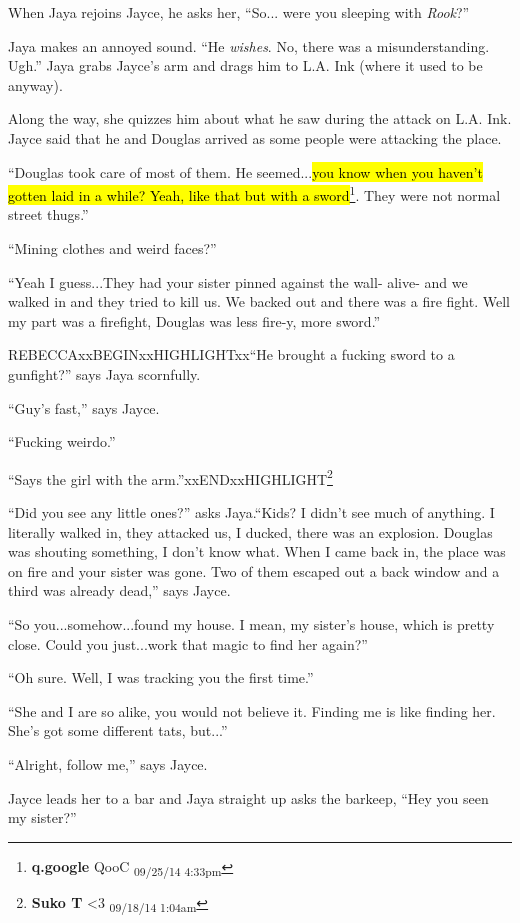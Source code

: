 When Jaya rejoins Jayce, he asks her, ``So... were you sleeping with \textit{Rook}?''

Jaya makes an annoyed sound.  ``He \textit{wishes}.  No, there was a misunderstanding.  Ugh.''  Jaya grabs Jayce's arm and drags him to L.A. Ink (where it used to be anyway).

Along the way, she quizzes him about what he saw during the attack on L.A. Ink.  Jayce said that he and Douglas arrived as some people were attacking the place.  

``Douglas took care of most of them. He seemed...\hl{you know when you haven't gotten laid in a while?  Yeah, like that but with a sword}\footnote{\textbf{q.google }QooC \textsubscript{09/25/14 4:33pm}}.  They were not normal street thugs.''

``Mining clothes and weird faces?''

``Yeah I guess...They had your sister pinned against the wall- alive- and we walked in and they tried to kill us.  We backed out and there was a fire fight.  Well my part was a firefight, Douglas was less fire-y, more sword.''

REBECCAxxBEGINxxHIGHLIGHTxx``He brought a fucking sword to a gunfight?'' says Jaya scornfully.

``Guy's fast,'' says Jayce.

``Fucking weirdo.''

``Says the girl with the arm.''xxENDxxHIGHLIGHT\footnote{\textbf{Suko T }\textless 3 \textsubscript{09/18/14 1:04am}}

``Did you see any little ones?'' asks Jaya.``Kids?  I didn't see much of anything.  I literally walked in, they attacked us, I ducked, there was an explosion.  Douglas was shouting something, I don't know what.  When I came back in, the place was on fire and your sister was gone.  Two of them escaped out a back window and a third was already dead,'' says Jayce.

``So you...somehow...found my house.  I mean, my sister's house, which is pretty close.  Could you just...work that magic to find her again?''

``Oh sure.  Well, I was tracking you the first time.''

``She and I are so alike, you would not believe it.  Finding me is like finding her.  She's got some different tats, but...''

``Alright, follow me,'' says Jayce.



Jayce leads her to a bar and Jaya straight up asks the barkeep, ``Hey you seen my sister?''

